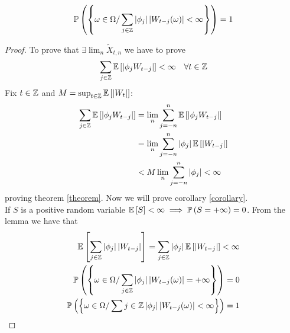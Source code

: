 \begin{corollary}
    \label{corollary}
    \[
        \mathbb{P}\left(\left\{\omega\in\Omega/\sum_{j\in\mathbb{Z}}\left|\phi_j\right|\left|W_{t-j}(\omega)\right|<\infty\right\}\right)=1  
    \]
\end{corollary}

\begin{proof}
    To prove that $\exists\lim_n\tilde{X}_{t,n}$ we have to prove
    \[
        \sum_{j\in\Z}\expect{\abs{\phi_jW_{t-j}}}<\infty\ \ \ \forall t\in\Z  
    \]
    Fix $t\in\mathbb{Z}$ and $M=\sup_{t\in\mathbb{Z}}\mathbb{E}\left[\left|W_t\right|\right]$:
    \begin{equation*}
        \begin{split}
            \sum_{j\in\mathbb{Z}}\mathbb{E}\left[\left|\phi_jW_{t-j}\right|\right]&=\lim_n\sum_{j=-n}^n\mathbb{E}\left[\left|\phi_jW_{t-j}\right|\right]\\
            &=\lim_n\sum_{j=-n}^n\left|\phi_j\right|\mathbb{E}\left[\left|W_{t-j}\right|\right]\\
            &<M\lim_n\sum_{j=-n}^n\left|\phi_j\right|<\infty
        \end{split}
    \end{equation*}
    proving theorem \ref{theorem}. Now we will prove corollary \ref{corollary}.\\
    If $S$ is a positive random variable $\mathbb{E}\left[S\right]<\infty\implies\mathbb{P}\left(S=+\infty\right)=0$. From the lemma we have that
    \begin{equation*}
        \begin{split}
            \mathbb{E}\left[\sum_{j\in\mathbb{Z}}\left|\phi_j\right|\left|W_{t-j}\right|\right]=\sum_{j\in\mathbb{Z}}\left|\phi_j\right|\mathbb{E}\left[\left|W_{t-j}\right|\right]<\infty\\
            \mathbb{P}\left(\left\{\omega\in\Omega/\sum_{j\in\mathbb{Z}}\left|\phi_j\right|\left|W_{t-j}(\omega)\right|=+\infty\right\}\right)=0\\
            \mathbb{P}\left(\left\{\omega\in\Omega/\sum{j\in\mathbb{Z}}\left|\phi_j\right|\left|W_{t-j}(\omega)\right|<\infty\right\}\right)=1
        \end{split}
    \end{equation*}
\end{proof}